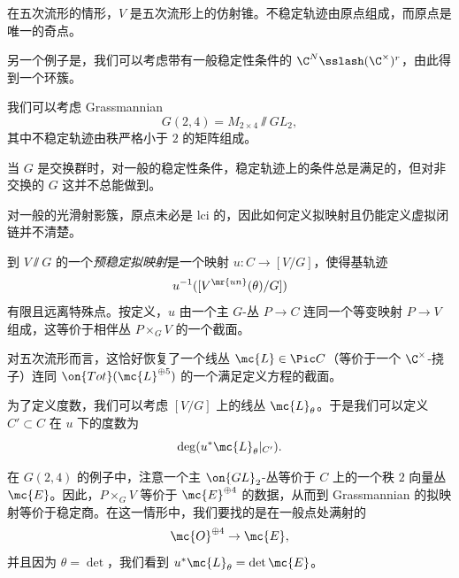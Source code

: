 \begin{exm}
    在五次流形的情形，\(V\) 是五次流形上的仿射锥。不稳定轨迹由原点组成，而原点是唯一的奇点。
\end{exm}

\begin{exm}
    另一个例子是，我们可以考虑带有一般稳定性条件的 \(\C^N \sslash (\C^{\times})^r\)，由此得到一个环簇。
\end{exm}

\begin{exm}
    我们可以考虑 Grassmannian
    \[ G(2,4) = M_{2\times 4} \sslash GL_2, \]
    其中不稳定轨迹由秩严格小于 \(2\) 的矩阵组成。
\end{exm}

\begin{rmk}
    当 \(G\) 是交换群时，对一般的稳定性条件，稳定轨迹上的条件总是满足的，但对非交换的 \(G\) 这并不总能做到。
\end{rmk}

\begin{rmk}
    对一般的光滑射影簇，原点未必是 lci 的，因此如何定义拟映射且仍能定义虚拟闭链并不清楚。
\end{rmk}

\begin{defn}
    到 \(V \sslash G\) 的一个\textit{预稳定拟映射}是一个映射 \(u \colon C \to [V/G]\)，使得基轨迹
    \[ u^{-1}([V^{\mr{un}}(\theta) / G]) \]
    有限且远离特殊点。按定义，\(u\) 由一个主 \(G\)-丛 \(P \to C\) 连同一个等变映射 \(P \to V\) 组成，这等价于相伴丛 \(P \times_G V\) 的一个截面。 
\end{defn}

\begin{exm}
    对五次流形而言，这恰好恢复了一个线丛 \(\mc{L} \in \Pic C\)（等价于一个 \(\C^{\times}\)-挠子）连同 \(\on{Tot}(\mc{L}^{\oplus 5})\) 的一个满足定义方程的截面。
\end{exm}

为了定义度数，我们可以考虑 \([V/G]\) 上的线丛 \(\mc{L}_{\theta}\)。于是我们可以定义 \(C' \subset C\) 在 \(u\) 下的度数为
\[ \deg (u^* \mc{L}_{\theta}|_{C'}). \]

\begin{exm}
    在 \(G(2,4)\) 的例子中，注意一个主 \(\on{GL}_2\)-丛等价于 \(C\) 上的一个秩 \(2\) 向量丛 \(\mc{E}\)。因此，\(P \times_G V\) 等价于 \(\mc{E}^{\oplus 4}\) 的数据，从而到 Grassmannian 的拟映射等价于稳定商。在这一情形中，我们要找的是在一般点处满射的
    \[ \mc{O}^{\oplus 4} \to \mc{E}, \]
    并且因为 \(\theta = \det\)，我们看到 \(u^* \mc{L}_{\theta} = \det \mc{E}\)。
\end{exm}

